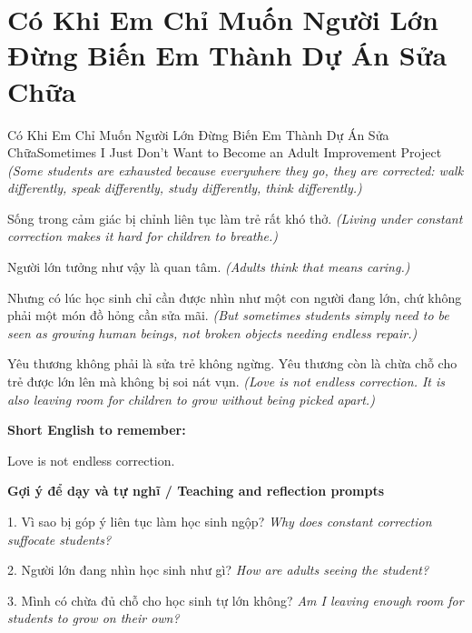 \section{Có Khi Em Chỉ Muốn Người Lớn Đừng Biến Em Thành Dự Án Sửa Chữa}
\begin{truyen}{Có Khi Em Chỉ Muốn Người Lớn Đừng Biến Em Thành Dự Án Sửa Chữa}{Sometimes I Just Don't Want to Become an Adult Improvement Project}
\textit{(Some students are exhausted because everywhere they go, they are corrected: walk differently, speak differently, study differently, think differently.)}

Sống trong cảm giác bị chỉnh liên tục làm trẻ rất khó thở.
\textit{(Living under constant correction makes it hard for children to breathe.)}

Người lớn tưởng như vậy là quan tâm.
\textit{(Adults think that means caring.)}

Nhưng có lúc học sinh chỉ cần được nhìn như một con người đang lớn, chứ không phải một món đồ hỏng cần sửa mãi.
\textit{(But sometimes students simply need to be seen as growing human beings, not broken objects needing endless repair.)}

\end{truyen}

\begin{baihoc}
Yêu thương không phải là sửa trẻ không ngừng. Yêu thương còn là chừa chỗ cho trẻ được lớn lên mà không bị soi nát vụn.
\textit{(Love is not endless correction. It is also leaving room for children to grow without being picked apart.)}
\end{baihoc}

\begin{ghinhoanh}
\textbf{Short English to remember:}

Love is not endless correction.

\end{ghinhoanh}

\begin{tuhocnhanh}
\textbf{Gợi ý để dạy và tự nghĩ / Teaching and reflection prompts}

1. Vì sao bị góp ý liên tục làm học sinh ngộp? \textit{Why does constant correction suffocate students?}

2. Người lớn đang nhìn học sinh như gì? \textit{How are adults seeing the student?}

3. Mình có chừa đủ chỗ cho học sinh tự lớn không? \textit{Am I leaving enough room for students to grow on their own?}
\end{tuhocnhanh}
\ngancach

